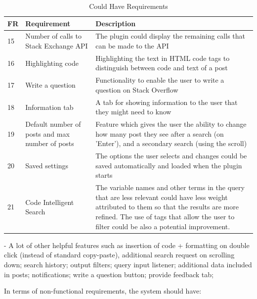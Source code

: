 \documentclass{l4proj}
\begin{document}
\begin{table}[h]
\caption{Could Have Requirements}
\centering
\def\arraystretch{1.5}
\begin{tabular}{p{2cm}p{4cm}p{9cm}}
\hline
FR & Requirement & Description \\
\hline
15 & Number of calls to Stack Exchange API & The plugin could display the remaining calls that can be made to the API\\
16 & Highlighting code & Highlighting the text in HTML code tags to distinguish between code and text of a post\\
17 & Write a question & Functionality to enable the user to write a question on Stack Overflow\\
18 & Information tab & A tab for showing information to the user that they might need to know\\
19 & Default number of posts and max number of posts & Feature which gives the user the ability to change how many post they see after a search (on 'Enter'), and a secondary search (using the scroll)\\
20 & Saved settings & The options the user selects and changes could be saved automatically and loaded when the plugin starts\\
21 & Code Intelligent Search & The variable names and other terms in the query that are less relevant could have less weight attributed to them so that the results are more refined. The use of tags that allow the user to filter could be also a potential improvement.\\
\hline
\end{tabular}
\label{table:couldTable}
\end{table}

- A lot of other helpful features such as insertion of code + formatting on double click (instead of standard copy-paste), additional search request on scrolling down; search history; output filters; query input listener; additional data included in posts; notifications; write a question button; provide feedback tab;

In terms of non-functional requirements, the system should have:
\end{document}
